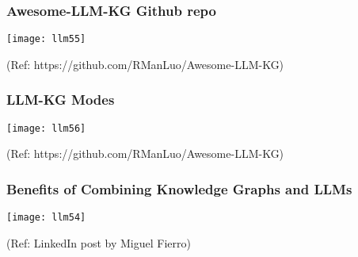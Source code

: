 \begin{frame}[fragile]\frametitle{Awesome-LLM-KG Github repo}

\begin{center}
\texttt{[image: llm55]}
\end{center}	

{\tiny (Ref: https://github.com/RManLuo/Awesome-LLM-KG)}

	
\end{frame}

\begin{frame}[fragile]\frametitle{LLM-KG Modes}

\begin{center}
\texttt{[image: llm56]}
\end{center}	

{\tiny (Ref: https://github.com/RManLuo/Awesome-LLM-KG)}

	
\end{frame}


\begin{frame}[fragile]\frametitle{Benefits of Combining Knowledge Graphs and LLMs}

\begin{center}
\texttt{[image: llm54]}
\end{center}	

{\tiny (Ref: LinkedIn post by Miguel Fierro)}

	
\end{frame}




